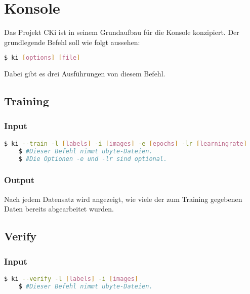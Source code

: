 \section{Konsole}
\label{sec:DesignKonsole}
Das Projekt CKi ist in seinem Grundaufbau für die Konsole konzipiert. Der grundlegende Befehl soll wie folgt aussehen: 
\begin{lstlisting}[language=bash]
	$ ki [options] [file]
\end{lstlisting}
Dabei gibt es drei Ausführungen von diesem Befehl.

\subsection{Training}
\label{sec:DesignTraining}
\subsubsection{Input}
\label{sec:DesignTraiInput}
\begin{lstlisting}[language=bash]
	$ ki --train -l [labels] -i [images] -e [epochs] -lr [learningrate]
	$ #Dieser Befehl nimmt ubyte-Dateien.
	$ #Die Optionen -e und -lr sind optional.
\end{lstlisting}

\subsubsection{Output}
\label{sec:TraiOutput}
Nach jedem Datensatz wird angezeigt, wie viele der zum Training gegebenen Daten bereits abgearbeitet wurden. 

\subsection{Verify}
\label{sec:DesignTest}
\subsubsection{Input}
\label{sec:DesignTestInput}
\begin{lstlisting}[language=bash]
	$ ki --verify -l [labels] -i [images]
	$ #Dieser Befehl nimmt ubyte-Dateien.
\end{lstlisting}

